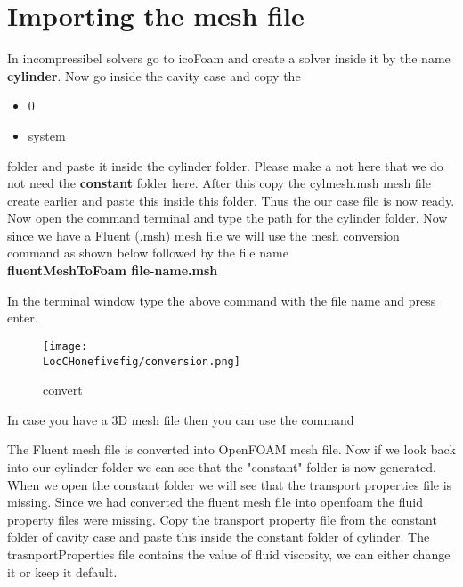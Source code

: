 \section{Importing the mesh file}

In incompressibel solvers go to icoFoam and create a solver inside it by the name \textbf{cylinder}. Now go inside the cavity case and copy the 
\begin{itemize}
\item 0
\item system
\end{itemize}

\flushleft folder and paste it inside the cylinder folder. Please make a not here that we do not need the \textbf{constant} folder here. After this copy the 
cylmesh.msh mesh file create earlier and paste this inside this folder. Thus the our case file is now ready. Now open the command terminal and type the
path for the cylinder folder. Now since we have a Fluent (.msh) mesh file we will use the mesh conversion command as shown below followed by the file name \\
\centering \textbf{fluentMeshToFoam file-name.msh} \newline

\flushleft In the terminal window type the above command with the file name and press enter.

\begin{figure}[h]  
\centering
\texttt{[image: \\LocCHonefivefig/conversion.png]}
\caption{convert}
\label{mesh}
\end{figure}

\flushleft In case you have a 3D mesh file then you can use the command \\ \vspace{0.5cm}
 \newline

\flushleft The Fluent mesh file is converted into OpenFOAM mesh file. Now if we look back into our cylinder folder we can see that the "constant"
folder is now generated. When we open the constant folder we will see that the transport properties file is missing. Since we had converted the 
fluent mesh file into openfoam the fluid property files were missing. Copy the transport property file from the constant folder of cavity case
and paste this inside the constant folder of cylinder. The trasnportProperties file contains the value of fluid viscosity, we can either change it
or keep it default. \newline

